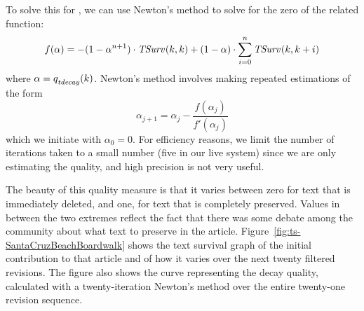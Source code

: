 To solve this for , we can use Newton's method
to solve for the zero of the related function:
\begin{equation*}
  f(\alpha) =
        - (1 - \alpha^{n+1}) \cdot \mathit{TSurv}_{}(k,k)
        + (1 - \alpha) \cdot \sum_{i=0}^n \mathit{TSurv}_{}(k,k+i)
\end{equation*}
where $\alpha = \quality{tdecay}{}{k}$.
Newton's method involves making repeated estimations of the form
\begin{equation*}
  \alpha_{j+1} = \alpha_j - \frac{f(\alpha_j)}{f'(\alpha_j)}
\end{equation*}
which we initiate with $\alpha_0 = 0$.
For efficiency reasons, we limit the number of iterations taken
to a small number (five in our live system)
since we are only estimating the quality, and high precision
is not very useful.

The beauty of this quality measure is that it varies between
zero for text that is immediately deleted, and one, for text
that is completely preserved.
Values in between the two extremes reflect the fact that there
was some debate among the community about what text to preserve
in the article.
Figure~\ref{fig:ts-SantaCruzBeachBoardwalk} shows the text survival
graph of the initial contribution to that article and of how it varies
over the next twenty filtered revisions.
The figure also shows the curve representing the decay quality,
calculated with a twenty-iteration Newton's method over the entire
twenty-one revision sequence.



